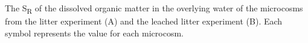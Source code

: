 \label{fig:sratio_day}

The S\textsubscript{R} of the dissolved organic matter in the overlying water of the microcosms from the litter experiment (A) and the leached litter experiment (B). Each symbol represents the value for each microcosm.